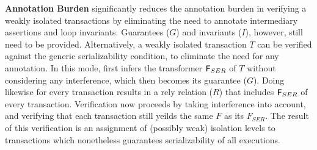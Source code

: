 \textbf{Annotation Burden} \tool significantly reduces the annotation
burden in verifying a weakly isolated transactions by eliminating the
need to annotate intermediary assertions and loop invariants.
Guarantees ($G$) and invariants ($I$), however, still need to be
provided. Alternatively, a weakly isolated transaction $T$ can be
verified against the generic serializability condition, to eliminate
the need for any annotation. In this mode, \tool first infers the
transformer ${\sf F}_{SER}$ of $T$ without considering any interference,
which then becomes its guarantee ($G$). Doing likewise for every
transaction results in a rely relation ($R$) that includes ${\sf F}_{SER}$
of every transaction. Verification now proceeds by taking interference
into account, and verifying that each transaction still yeilds the
same $F$ as its $F_{SER}$. The result of this verification is an
assignment of (possibly weak) isolation levels to transactions which
nonetheless guarantees serializability of all executions.  



